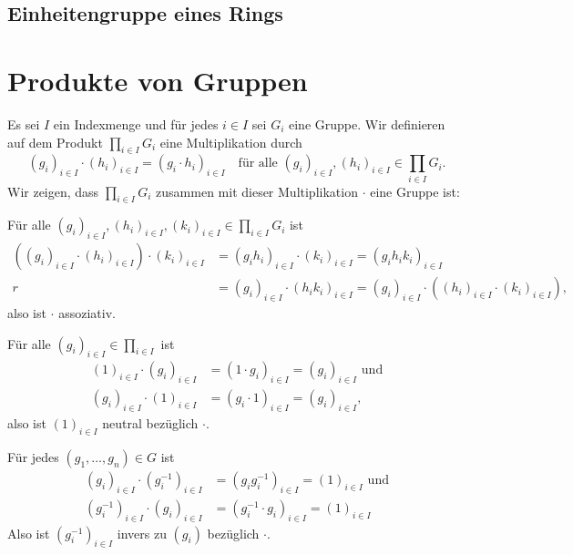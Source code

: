 \subsection{Einheitengruppe eines Rings}











\section{Produkte von Gruppen}\label{sec: product of groups}

Es sei $I$ ein Indexmenge und für jedes $i \in I$ sei $G_i$ eine Gruppe. Wir definieren auf dem Produkt $\prod_{i \in I} G_i$ eine Multiplikation durch
\[
 (g_i)_{i \in I} \cdot (h_i)_{i \in I}
 = (g_i \cdot h_i)_{i \in I}
 \quad
 \text{für alle $(g_i)_{i \in I}, (h_i)_{i \in I} \in \prod_{i \in I} G_i$}.
\]
Wir zeigen, dass $\prod_{i \in I} G_i$ zusammen mit dieser Multiplikation $\cdot$ eine Gruppe ist:

Für alle $(g_i)_{i \in I}, (h_i)_{i \in I}, (k_i)_{i \in I} \in \prod_{i \in I} G_i$ ist
\begin{align*}
 ( (g_i)_{i \in I} \cdot (h_i)_{i \in I} ) \cdot (k_i)_{i \in I}
 &= (g_i h_i)_{i \in I} \cdot (k_i)_{i \in I}
 = (g_i h_i k_i)_{i \in I} \\r
 &= (g_i)_{i \in I} \cdot (h_i k_i)_{i \in I}
 = (g_i)_{i \in I} \cdot ( (h_i)_{i \in I} \cdot (k_i)_{i \in I} ),
\end{align*}
also ist $\cdot$ assoziativ.

Für alle $(g_i)_{i \in I} \in \prod_{i \in I}$ ist
\begin{align*}
 (1)_{i \in I} \cdot (g_i)_{i \in I}
 &= (1 \cdot g_i)_{i \in I}
 = (g_i)_{i \in I}
 \text{ und} \\
 (g_i)_{i \in I} \cdot (1)_{i \in I}
 &= (g_i \cdot 1)_{i \in I}
 = (g_i)_{i \in I},
\end{align*}
also ist $(1)_{i \in I}$ neutral bezüglich $\cdot$.

Für jedes $(g_1, \dotsc, g_n) \in G$ ist
\begin{align*}
 (g_i)_{i \in I} \cdot (g_i^{-1})_{i \in I}
 &= (g_i g_i^{-1})_{i \in I}
 = (1)_{i \in I} \text{ und} \\
 (g_i^{-1})_{i \in I} \cdot (g_i)_{i \in I}
 &= (g_i^{-1} \cdot g_i)_{i \in I}
 = (1)_{i \in I}
\end{align*}
Also ist $(g_i^{-1})_{i \in I}$ invers zu $(g_i)$ bezüglich $\cdot$.

